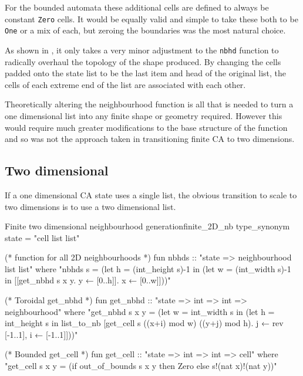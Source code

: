 For the bounded automata these additional cells are defined to always be constant \texttt{Zero} cells.
It would be equally valid and simple to take these both to be \texttt{One} or a mix of each,
but zeroing the boundaries was the most natural choice.

As shown in ,
it only takes a very minor adjustment to the \texttt{nbhd} function to radically overhaul the topology of the shape produced.
By changing the cells padded onto the state list to be the last item and head of the original list,
the cells of each extreme end of the list are associated with each other.

Theoretically altering the neighbourhood function is all that is needed to turn a one dimensional list into any finite shape or geometry required.
However this would require much greater modifications to the base structure of the function
and so was not the approach taken in transitioning finite CA to two dimensions.


\subsection{Two dimensional}

If a one dimensional CA state uses a single list,
the obvious transition to scale to two dimensions is to use a two dimensional list.

\begin{myminted}{Finite two dimensional neighbourhood generation}{finite_2D_nb}
    type_synonym state = "cell list list"

    (* function for all 2D neighbourhoods *)
    fun nbhds :: "state => neighbourhood list list" where
        "nbhds s = (let h = (int_height s)-1
        in (let w = (int_width s)-1 in
        [[get_nbhd s x y. y ← [0..h]]. x ← [0..w]]))"

    (* Toroidal get_nbhd *)
    fun get_nbhd :: "state => int => int => neighbourhood" where
        "get_nbhd s x y =
        (let w = int_width s in
        (let h = int_height s in
        list_to_nb [get_cell s ((x+i) mod w) ((y+j) mod h).
            j ← rev [-1..1], i ← [-1..1]]))"

    (* Bounded get_cell *)
    fun get_cell :: "state => int => int => cell" where
        "get_cell s x y = (if out_of_bounds s x y
                           then Zero
                           else  s!(nat x)!(nat y))"
\end{myminted}

